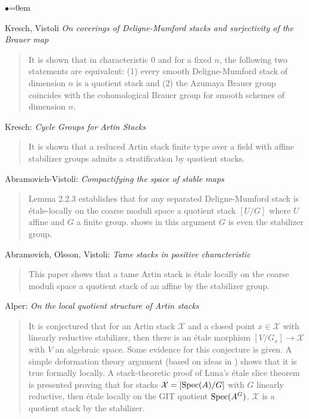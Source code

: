 \begin{list}{$\bullet$}{\leftmargin=0em}
\begin{quote}
\end{quote}
\smallskip
\item
Kresch, Vistoli \emph{On coverings of Deligne-Mumford stacks and surjectivity 
of the Brauer map} \cite{kresch-vistoli}
\begin{quote}
It is shown that in characteristic 0 and for a fixed $n$, the following two 
statements are equivalent: (1) every smooth Deligne-Mumford stack of dimension 
$n$ is a quotient stack and (2) the Azumaya Brauer group coincides with the 
cohomological Brauer group for smooth schemes of dimension $n$.
\end{quote}
\smallskip
\item
Kresch: \emph{Cycle Groups for Artin Stacks} \cite{kresch_cycle}
\begin{quote}
It is shown that a reduced Artin stack finite type over a field with affine 
stabilizer groups admits a stratification by quotient stacks.
\end{quote}
\smallskip
\item Abramovich-Vistoli:
\emph{Compactifying the space of stable maps} \cite{abramovich-vistoli}
\begin{quote}
Lemma 2.2.3 establishes that for any separated Deligne-Mumford stack is 
\'etale-locally on the coarse moduli space a quotient stack $[U/G]$ where $U$ 
affine and $G$ a finite group. \cite[Theorem 2.12]{olsson_homstacks} shows in 
this argument $G$ is even the stabilizer group.
\end{quote}
\smallskip
\item Abramovich, Olsson, Vistoli:
\emph{Tame stacks in positive characteristic} \cite{tame}
\begin{quote}
This paper shows that a tame Artin stack is \'etale locally on the coarse 
moduli space a quotient stack of an affine by the stabilizer group.
\end{quote}
\smallskip
\item Alper: \emph{On the local quotient structure of Artin stacks} 
\cite{alper_quotient}
\begin{quote}
It is conjectured that for an Artin stack $\mathcal{X}$ and a closed point $x 
\in \mathcal{X}$ 
with linearly reductive stabilizer, then there is an \'etale morphism $[V/G_x] 
\to \mathcal{X}$ with $V$ an algebraic space. Some evidence for this 
conjecture is 
given. A simple deformation theory argument (based on ideas in \cite{tame}) 
shows that it is true formally locally. A stack-theoretic proof of Luna's 
\'etale slice theorem is presented proving that for stacks 
$\mathcal{X} = [\mathop{\rm Spec}(A)/G]$ 
with $G$ linearly reductive, then \'etale locally on the GIT quotient 
$\mathop{\rm Spec}(A^G)$, $\mathcal{X}$ is a quotient stack by the stabilizer. 
\end{quote}
\end{list}

